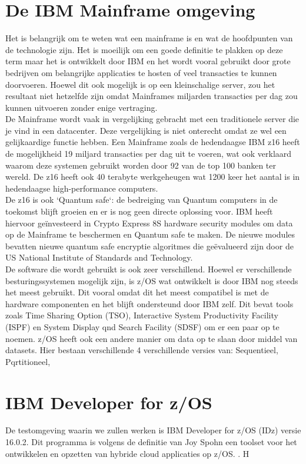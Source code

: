 \section{De IBM Mainframe omgeving}
Het is belangrijk om te weten wat een mainframe is en wat de hoofdpunten van de technologie zijn. Het is moeilijk om een goede definitie te plakken op deze term maar het is ontwikkelt door IBM en het wordt vooral gebruikt door grote bedrijven om belangrijke applicaties te hosten of veel transacties te kunnen doorvoeren. Hoewel dit ook mogelijk is op een kleinschalige server, zou het resultaat niet hetzelfde zijn omdat Mainframes miljarden transacties per dag zou kunnen uitvoeren zonder enige vertraging. \autocite{BasuMallick2023} \\
De Mainframe wordt vaak in vergelijking gebracht met een traditionele server die je vind in een datacenter. Deze vergelijking is niet onterecht omdat ze wel een gelijkaardige functie hebben. Een Mainframe zoals de hedendaagse IBM z16 heeft de mogelijkheid 19 miljard transacties per dag uit te voeren, wat ook verklaard waarom deze systemen gebruikt worden door 92 van de top 100 banken ter wereld. De z16 heeft ook 40 terabyte werkgeheugen wat 1200 keer het aantal is in hedendaagse high-performance computers. \autocite{Tozzi2022} \\ 
De z16 is ook `Quantum safe`: de bedreiging van Quantum computers in de toekomst blijft groeien en er is nog geen directe oplossing voor. IBM heeft hiervoor geïnvesteerd in Crypto Express 8S hardware security modules om data op de Mainframe te beschermen en Quantum safe te maken. De nieuwe modules bevatten nieuwe quantum safe encryptie algoritmes die geëvalueerd zijn door de US National Institute of Standards and Technology. \autocite{Sayer2022}
\\
De software die wordt gebruikt is ook zeer verschillend. Hoewel er verschillende besturingssystemen mogelijk zijn, is z/OS wat ontwikkelt is door IBM nog steeds het meest gebruikt. Dit vooral omdat dit het meest compatibel is met de hardware componenten en het blijft ondersteund door IBM zelf. Dit bevat tools zoals Time Sharing Option (TSO), Interactive System Productivity Facility (ISPF) en System Display qnd Search Facility (SDSF) om er een paar op te noemen. z/OS heeft ook een andere manier om data op te slaan door middel van datasets. Hier bestaan verschillende 4 verschillende versies van: Sequentieel, Pqrtitioneel, 

\section{IBM Developer for z/OS}
De testomgeving waarin we zullen werken is IBM Developer for z/OS (IDz) versie 16.0.2. Dit programma is volgens de definitie van Joy Spohn een toolset voor het ontwikkelen en opzetten van hybride cloud applicaties op z/OS. \textcite{Spohn2023}. H


